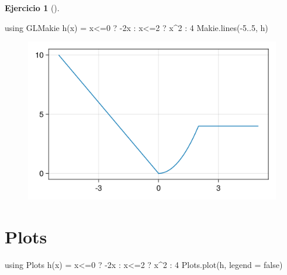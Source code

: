 \documentclass[
  a4paper,
]{scrreport}
\newenvironment{Shaded}{\begin{snugshade}}{\end{snugshade}}
\newcommand{\BuiltInTok}[1]{\textcolor[rgb]{0.00,0.23,0.31}{#1}}
\newcommand{\ConstantTok}[1]{\textcolor[rgb]{0.56,0.35,0.01}{#1}}
\newcommand{\FloatTok}[1]{\textcolor[rgb]{0.68,0.00,0.00}{#1}}
\newcommand{\FunctionTok}[1]{\textcolor[rgb]{0.28,0.35,0.67}{#1}}
\newcommand{\ImportTok}[1]{\textcolor[rgb]{0.00,0.46,0.62}{#1}}
\newcommand{\NormalTok}[1]{\textcolor[rgb]{0.00,0.23,0.31}{#1}}
\newcommand{\OperatorTok}[1]{\textcolor[rgb]{0.37,0.37,0.37}{#1}}
\theoremstyle{definition}
\newtheorem{exercise}{Ejercicio}[chapter]
\theoremstyle{remark}
\begin{document}
\begin{exercise}[]
\begin{tcolorbox}
\begin{Shaded}
\begin{Highlighting}[]
\ImportTok{using} \BuiltInTok{GLMakie}
\FunctionTok{h}\NormalTok{(x) }\OperatorTok{=}\NormalTok{ x}\OperatorTok{\textless{}=}\FloatTok{0}\NormalTok{ ? }\OperatorTok{{-}}\FloatTok{2}\NormalTok{x }\OperatorTok{:}\NormalTok{ x}\OperatorTok{\textless{}=}\FloatTok{2}\NormalTok{ ? x}\OperatorTok{\^{}}\FloatTok{2} \OperatorTok{:} \FloatTok{4}
\NormalTok{Makie.}\FunctionTok{lines}\NormalTok{(}\OperatorTok{{-}}\FloatTok{5}\OperatorTok{..}\FloatTok{5}\NormalTok{, h)}
\end{Highlighting}
\end{Shaded}

\begin{figure}[H]

{\centering \includegraphics{03-funciones-elementales_files/figure-pdf/cell-31-output-1.png}

}

\end{figure}

\section{Plots}

\begin{Shaded}
\begin{Highlighting}[]
\ImportTok{using} \BuiltInTok{Plots}
\FunctionTok{h}\NormalTok{(x) }\OperatorTok{=}\NormalTok{ x}\OperatorTok{\textless{}=}\FloatTok{0}\NormalTok{ ? }\OperatorTok{{-}}\FloatTok{2}\NormalTok{x }\OperatorTok{:}\NormalTok{ x}\OperatorTok{\textless{}=}\FloatTok{2}\NormalTok{ ? x}\OperatorTok{\^{}}\FloatTok{2} \OperatorTok{:} \FloatTok{4}
\NormalTok{Plots.}\FunctionTok{plot}\NormalTok{(h, legend }\OperatorTok{=} \ConstantTok{false}\NormalTok{)}
\end{Highlighting}
\end{Shaded}


\end{tcolorbox}
\end{exercise}
\end{document}

